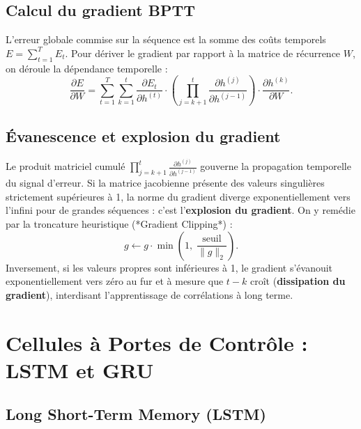 \subsection{Calcul du gradient BPTT}

L'erreur globale commise sur la séquence est la somme des coûts temporels $E = \sum_{t=1}^T E_t$. Pour dériver le gradient par rapport à la matrice de récurrence $W$, on déroule la dépendance temporelle :
\begin{equation}
    \frac{\partial E}{\partial W} = \sum_{t=1}^T \sum_{k=1}^t \frac{\partial E_t}{\partial h^{(t)}} \cdot \left( \prod_{j=k+1}^t \frac{\partial h^{(j)}}{\partial h^{(j-1)}} \right) \cdot \frac{\partial h^{(k)}}{\partial W}.
\end{equation}

\subsection{Évanescence et explosion du gradient}

Le produit matriciel cumulé $\prod_{j=k+1}^t \frac{\partial h^{(j)}}{\partial h^{(j-1)}}$ gouverne la propagation temporelle du signal d'erreur. Si la matrice jacobienne présente des valeurs singulières strictement supérieures à 1, la norme du gradient diverge exponentiellement vers l'infini pour de grandes séquences : c'est l'\textbf{explosion du gradient}. On y remédie par la troncature heuristique (*Gradient Clipping*) :
\begin{equation}
    g \leftarrow g \cdot \min\left(1, \; \frac{\text{seuil}}{\|g\|_2}\right).
\end{equation}
Inversement, si les valeurs propres sont inférieures à 1, le gradient s'évanouit exponentiellement vers zéro au fur et à mesure que $t - k$ croît (\textbf{dissipation du gradient}), interdisant l'apprentissage de corrélations à long terme.


\section{Cellules à Portes de Contrôle : LSTM et GRU}

\subsection{Long Short-Term Memory (LSTM)}

